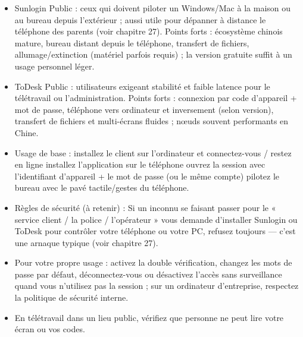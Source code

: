 \begin{itemize}
  \item Sunlogin Public : ceux qui doivent piloter un Windows/Mac à la maison ou au bureau depuis l'extérieur ; aussi utile pour dépanner à distance le téléphone des parents (voir chapitre 27). Points forts : écosystème chinois mature, bureau distant depuis le téléphone, transfert de fichiers, allumage/extinction (matériel parfois requis) ; la version gratuite suffit à un usage personnel léger.
  \item ToDesk Public : utilisateurs exigeant stabilité et faible latence pour le télétravail ou l'administration. Points forts : connexion par code d'appareil + mot de passe, téléphone vers ordinateur et inversement (selon version), transfert de fichiers et multi-écrans fluides ; nœuds souvent performants en Chine.
  \item Usage de base : installez le client sur l'ordinateur et connectez-vous / restez en ligne installez l'application sur le téléphone ouvrez la session avec l'identifiant d'appareil + le mot de passe (ou le même compte) pilotez le bureau avec le pavé tactile/gestes du téléphone.
  \item Règles de sécurité (à retenir) : Si un inconnu se faisant passer pour le « service client / la police / l'opérateur » vous demande d'installer Sunlogin ou ToDesk pour contrôler votre téléphone ou votre PC, refusez toujours — c'est une arnaque typique (voir chapitre 27).
  \item Pour votre propre usage : activez la double vérification, changez les mots de passe par défaut, déconnectez-vous ou désactivez l'accès sans surveillance quand vous n'utilisez pas la session ; sur un ordinateur d'entreprise, respectez la politique de sécurité interne.
  \item En télétravail dans un lieu public, vérifiez que personne ne peut lire votre écran ou vos codes.
\end{itemize}



